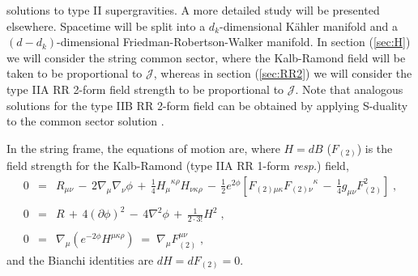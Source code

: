 \documentclass[a4paper,11pt]{article}
\begin{document}
solutions to type II supergravities. A more detailed study will
be presented elsewhere. 
Spacetime will be split into
a $d_{k}$-dimensional K\"ahler manifold
and a $(d-d_{k})$-dimensional Friedman-Robertson-Walker manifold.
In section (\ref{sec:H}) we will consider the string common sector,
where the Kalb-Ramond field will be taken to be proportional
to $\mathcal{J}$, whereas in section (\ref{sec:RR2})
we will consider the type IIA RR 2-form field strength
to be proportional to $\mathcal{J}$.
Note that analogous solutions for the type IIB RR 2-form field can be obtained
by applying S-duality to the common sector solution \cite{art:BHO}.
\par
In the string frame, the equations of motion are, where $H=dB$ ($F_{(2)}$)
is the field strength for the Kalb-Ramond
(type IIA RR 1-form {\em resp.}) field,
\begin{eqnarray}
0&=& R_{\mu\nu}
     \,-\, 2\nabla_{\mu}\nabla_{\nu}\phi
     \,+\, \textstyle{\frac{1}{4}}
               {H_{\mu}}^{\kappa\rho}H_{\nu\kappa\rho} 
     \,-\, \textstyle{\frac{1}{2}}e^{2\phi}
             \left[
                 F_{(2)\mu\kappa}{F_{(2)\nu}}^{\kappa}
                 \,-\,
                 \textstyle{\frac{1}{4}}g_{\mu\nu}F_{(2)}^{2}
             \right] \; ,\\
& & \nonumber \\
0 &=& R
      \,+\, 4\left(\partial\phi\right)^{2}
      \,-\, 4 \nabla^{2}\phi
      \,+\, \textstyle{\frac{1}{2\cdot 3!}}H^{2} \; , \\
& & \nonumber \\
0 &=& \nabla_{\mu}\left( e^{-2\phi}H^{\mu\kappa\rho}\right) 
  \;=\; \nabla_{\mu}F_{(2)}^{\mu\nu} \; ,
\label{eq:EOMstring}
\end{eqnarray}
and the Bianchi identities are $dH=dF_{(2)}=0$.
\end{document}
